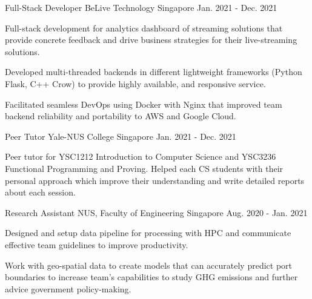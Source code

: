 \begin{cventries}
  \cventry
    {Full-Stack Developer} %
    {BeLive Technology} %
    {Singapore} %
    {Jan. 2021 - Dec. 2021} %
    {
      \begin{cvitems} %
        \item {Full-stack development for analytics dashboard of streaming solutions that provide concrete feedback and drive business strategies for their live-streaming solutions.}
        \item {Developed multi-threaded backends in different lightweight frameworks (Python Flask, C++ Crow) to provide highly available, and responsive service.}
        \item {Facilitated seamless DevOps using Docker with Nginx that improved team backend reliability and portability to AWS and Google Cloud.}
      \end{cvitems}
    }

  \cventry
    {Peer Tutor} %
    {Yale-NUS College} %
    {Singapore} %
    {Jan. 2021 - Dec. 2021} %
    {
      \begin{cvitems} %
        \item {Peer tutor for YSC1212 Introduction to Computer Science and YSC3236 Functional Programming and Proving.  Helped each CS students with their personal approach which improve their understanding and write detailed reports about each session.}
      \end{cvitems}
    }
    
  \cventry
    {Research Assistant} %
    {NUS, Faculty of Engineering} %
    {Singapore} %
    {Aug. 2020 - Jan. 2021} %
    {
      \begin{cvitems} %
        \item {Designed and setup data pipeline for processing with HPC and communicate effective team guidelines to improve productivity.}
        \item {Work with geo-spatial data to create models that can accurately predict port boundaries to increase team’s capabilities to study GHG emissions and further advice government policy-making.}
      \end{cvitems}
    }
    

\end{cventries}
